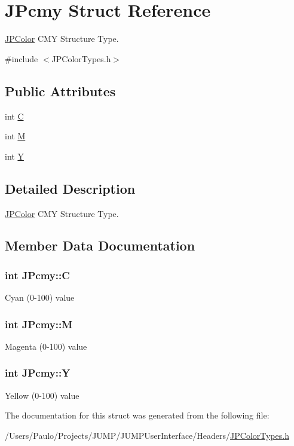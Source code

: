 \hypertarget{struct_j_pcmy}{
\section{JPcmy Struct Reference}
\label{struct_j_pcmy}
}


\hyperlink{interface_j_p_color}{JPColor} CMY Structure Type.  




{\ttfamily \#include $<$JPColorTypes.h$>$}

\subsection*{Public Attributes}
\begin{DoxyCompactItemize}
\item 
int \hyperlink{struct_j_pcmy_acb02d8f855f9f095cb4f124780184d70}{C}
\item 
int \hyperlink{struct_j_pcmy_ac6483cc803718dbcfd99ce13bc380923}{M}
\item 
int \hyperlink{struct_j_pcmy_aa06e890397d56b7d4e8bb64aa1e82b7c}{Y}
\end{DoxyCompactItemize}


\subsection{Detailed Description}
\hyperlink{interface_j_p_color}{JPColor} CMY Structure Type. 

\subsection{Member Data Documentation}
\hypertarget{struct_j_pcmy_acb02d8f855f9f095cb4f124780184d70}{
\subsubsection[{C}]{\setlength{\rightskip}{0pt plus 5cm}int {\bf JPcmy::C}}}
\label{struct_j_pcmy_acb02d8f855f9f095cb4f124780184d70}
Cyan (0-\/100) value \hypertarget{struct_j_pcmy_ac6483cc803718dbcfd99ce13bc380923}{
\subsubsection[{M}]{\setlength{\rightskip}{0pt plus 5cm}int {\bf JPcmy::M}}}
\label{struct_j_pcmy_ac6483cc803718dbcfd99ce13bc380923}
Magenta (0-\/100) value \hypertarget{struct_j_pcmy_aa06e890397d56b7d4e8bb64aa1e82b7c}{
\subsubsection[{Y}]{\setlength{\rightskip}{0pt plus 5cm}int {\bf JPcmy::Y}}}
\label{struct_j_pcmy_aa06e890397d56b7d4e8bb64aa1e82b7c}
Yellow (0-\/100) value 

The documentation for this struct was generated from the following file:\begin{DoxyCompactItemize}
\item 
/Users/Paulo/Projects/JUMP/JUMPUserInterface/Headers/\hyperlink{_j_p_color_types_8h}{JPColorTypes.h}\end{DoxyCompactItemize}
